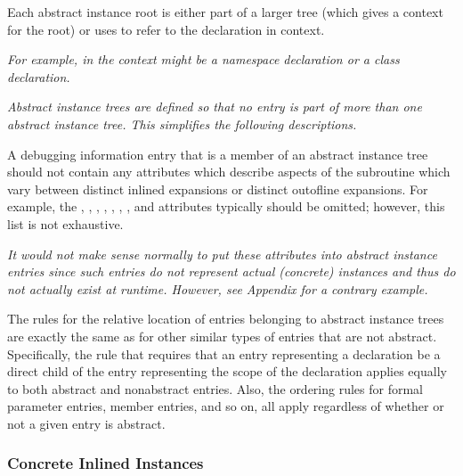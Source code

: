 Each abstract instance root is either part of a larger
tree (which gives a context for the root) or 
uses
\DWATspecification{} 
to refer to the declaration in context.

\textit{For example, in  the context might be a namespace
declaration or a class declaration.}

\textit{Abstract instance trees are defined so that no entry is part
of more than one abstract instance tree. This simplifies the
following descriptions.}

A debugging information entry that is a member of an abstract
instance tree should not contain any attributes which describe
aspects of the subroutine which vary between distinct inlined
expansions or distinct out\dash of\dash line expansions. For example,
the \DWATlowpc,
\DWAThighpc, 
\DWATranges, 
\DWATentrypc, 
\DWATlocation,
\DWATreturnaddr, 
\DWATstartscope, 
and 
\DWATsegment{}
attributes 
typically 
should 
be 
omitted; 
however, 
this 
list
is not exhaustive.

\textit{It would not make sense normally to put these attributes into
abstract instance entries since such entries do not represent
actual (concrete) instances and thus do not actually exist at
run\dash time.  However, 
see Appendix  
for a contrary example.}

The rules for the relative location of entries belonging to
abstract instance trees are exactly the same as for other
similar types of entries that are not abstract. Specifically,
the rule that requires that an entry representing a declaration
be a direct child of the entry representing the scope of the
declaration applies equally to both abstract and non\dash abstract
entries. Also, the ordering rules for formal parameter entries,
member entries, and so on, all apply regardless of whether
or not a given entry is abstract.

\subsubsection{Concrete Inlined Instances}
\label{chap:concreteinlinedinstances}

